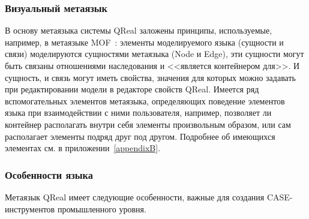 \subsubsection{Визуальный метаязык}
В основу метаязыка системы QReal заложены принципы, используемые, например, в метаязыке MOF~\cite{mof}: 
элементы моделируемого языка (сущности и связи) моделируются сущностями метаязыка 
(Node и Edge), эти сущности могут быть связаны отношениями наследования и <<является контейнером для>>. 
И сущность, и связь могут иметь свойства, значения для которых можно задавать при 
редактировании модели в редакторе свойств QReal. Имеется ряд вспомогательных элементов 
метаязыка, определяющих поведение элементов языка при взаимодействии с ними пользователя, 
например, позволяет ли контейнер располагать внутри себя элементы произвольным образом, 
или сам располагает элементы подряд друг под другом. Подробнее об имеющихся элементах 
см. в приложении~\ref{appendixB}.

\subsubsection{Особенности языка}
Метаязык QReal имеет следующие особенности, важные для создания CASE-инструментов 
промышленного уровня.

